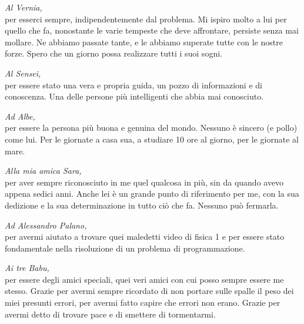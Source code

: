\documentclass[twoside]{article}
\begin{document}
\textit{Al Vernia,}\\
per esserci sempre, indipendentemente dal problema. Mi ispiro molto a lui per quello che fa, nonostante le varie tempeste che deve affrontare, persiste senza mai mollare. Ne abbiamo passate tante, e le abbiamo superate tutte con le nostre forze. Spero che un giorno possa realizzare tutti i suoi sogni.

\vspace{\baselineskip}
\vspace{\baselineskip}
\vspace{\baselineskip}

\textit{Al Sensei,}\\
per essere stato una vera e propria guida, un pozzo di informazioni e di conoscenza. Una delle persone più intelligenti che abbia mai conosciuto.

\vspace{\baselineskip}

\textit{Ad Albe,}\\
per essere la persona più buona e genuina del mondo. Nessuno è sincero (e pollo) come lui. Per le giornate a casa sua, a studiare 10 ore al giorno, per le giornate al mare.

\vspace{\baselineskip}

\textit{Alla mia amica Sara,}\\
per aver sempre riconosciuto in me quel qualcosa in più, sin da quando avevo appena sedici anni. Anche lei è un grande punto di riferimento per me, con la sua dedizione e la sua determinazione in tutto ciò che fa. Nessuno può fermarla.

\vspace{\baselineskip}

\textit{Ad Alessandro Palano,}\\
per avermi aiutato a trovare quei maledetti video di fisica 1 e per essere stato fondamentale nella risoluzione di un problema di programmazione.

\vspace{\baselineskip}

\textit{Ai tre Babu,}\\
per essere degli amici speciali, quei veri amici con cui posso sempre essere me stesso. Grazie per avermi sempre ricordato di non portare sulle spalle il peso dei miei presunti errori, per avermi fatto capire che errori non erano. Grazie per avermi detto di trovare pace e di smettere di tormentarmi.

\vspace{\baselineskip}
\end{document}
